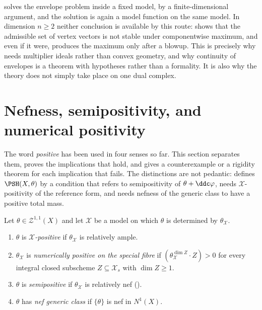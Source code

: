 \begin{remark}
\label{rem:ch20-fixed-model-envelope-scope}
 solves the envelope problem inside a fixed
model, by a finite-dimensional argument, and the solution is again a model
function on the same model.  In dimension \(n\geq2\) neither conclusion is
available by this route:  shows that the
admissible set of vertex vectors is not stable under componentwise maximum,
and even if it were,  produces the maximum only
after a blowup.  This is precisely why
 needs multiplier ideals rather than convex
geometry, and why continuity of envelopes is a theorem with hypotheses
rather than a formality.  It is also why the theory does not simply take
place on one dual complex.
\end{remark}

\section{Nefness, semipositivity, and numerical positivity}
\label{sec:ch20-positivity}

The word \emph{positive} has been used in four senses so far.  This section
separates them, proves the implications that hold, and gives a
counterexample or a rigidity theorem for each implication that fails.  The
distinctions are not pedantic:  defines
\(\PSH(X,\theta)\) by a condition that refers to semipositivity of
\(\theta+\ddc\varphi\),  needs
\(\mathcal X\)-positivity of the reference form, and
 needs nefness of the generic class to have a positive
total mass.

\begin{definition}
\label{def:ch20-four-positivities}
Let \(\theta\in\mathcal Z^{1,1}(X)\) and let \(\mathcal X\) be a model on
which \(\theta\) is determined by \(\theta_{\mathcal X}\).
\begin{enumerate}
\item\label{itm:ch20-pos:ample} \(\theta\) is \emph{\(\mathcal X\)-positive}
 if \(\theta_{\mathcal X}\) is relatively ample.
\item\label{itm:ch20-pos:numerical} \(\theta_{\mathcal X}\) is
 \emph{numerically positive on the special fibre} if
 \((\theta_{\mathcal X}^{\dim Z}\cdot Z)>0\) for every integral closed
 subscheme \(Z\subseteq\mathcal X_s\) with \(\dim Z\geq1\).
\item\label{itm:ch20-pos:semi} \(\theta\) is \emph{semipositive} if
 \(\theta_{\mathcal X}\) is relatively nef
 ().
\item\label{itm:ch20-pos:generic} \(\theta\) has \emph{nef generic class}
 if \(\{\theta\}\) is nef in \(N^1(X)\).
\end{enumerate}
\end{definition}

